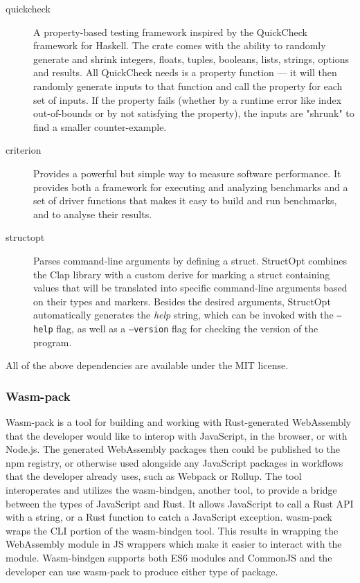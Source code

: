 \documentclass[english,engineering]{wizthesis}
\begin{document}
\begin{description}
  \item[quickcheck] A property-based testing framework inspired by the
  QuickCheck framework for Haskell. The crate comes with the ability to randomly
  generate and shrink integers, floats, tuples, booleans, lists, strings,
  options and results. All QuickCheck needs is a property function --- it will
  then randomly generate inputs to that function and call the property for each
  set of inputs. If the property fails (whether by a runtime error like index
  out-of-bounds or by not satisfying the property), the inputs are "shrunk" to
  find a smaller counter-example.
  \item[criterion] Provides a powerful but simple way to measure software
  performance. It provides both a framework for executing and analyzing
  benchmarks and a set of driver functions that makes it easy to build and run
  benchmarks, and to analyse their results.
  \item[structopt] Parses command-line arguments by defining a struct. StructOpt
  combines the Clap library with a custom derive for marking a struct containing
  values that will be translated into specific command-line arguments based on
  their types and markers. Besides the desired arguments, StructOpt
  automatically generates the \emph{help} string, which can be invoked with the
  \texttt{--help} flag, as well as a \texttt{--version} flag for checking the
  version of the program.
\end{description}
All of the above dependencies are available under the MIT license.

\subsubsection*{Wasm-pack}

Wasm-pack is a tool for building and working with Rust-generated WebAssembly
that the developer would like to interop with JavaScript, in the browser, or
with Node.js. The generated WebAssembly packages then could be published to the
npm registry, or otherwise used alongside any JavaScript packages in workflows
that the developer already uses, such as Webpack or Rollup. The tool
interoperates and utilizes the wasm-bindgen, another tool, to provide a bridge
between the types of JavaScript and Rust. It allows JavaScript to call a Rust
API with a string, or a Rust function to catch a JavaScript exception. wasm-pack
wraps the CLI portion of the wasm-bindgen tool. This results in wrapping the
WebAssembly module in JS wrappers which make it easier to interact with the
module. Wasm-bindgen supports both ES6 modules and CommonJS and the developer
can use wasm-pack to produce either type of package.
\end{document}
